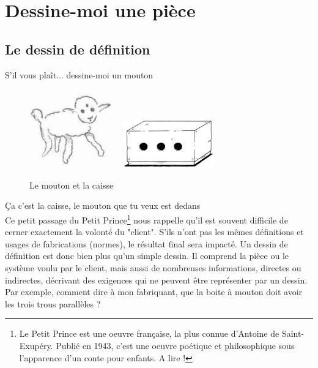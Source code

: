 \documentclass[
	11pt, %
	fleqn, %
	a4paper, %
]{LegrandOrangeBook}
\begin{document}

\chapter{Dessine-moi une pièce}
\section{Le dessin de définition}\label{dessin}


 \og S'il vous plaît... dessine-moi un mouton \fg


\begin{figure}[H] %
	\centering %
	\includegraphics[width=0.35\textwidth]{Images/Mou2.JPG} %
    \includegraphics[width=0.35\textwidth]{Images/Mou1.JPG} %
	\caption{Le mouton et la caisse}
	\label{Mou} %
\end{figure}



    \og Ça c'est la caisse, le mouton que tu veux est dedans\fg \\



Ce petit passage du Petit Prince\footnote{Le Petit Prince est une oeuvre française, la plus connue d'Antoine de Saint-Exupéry. Publié en 1943, c'est une oeuvre poétique et philosophique sous l'apparence d'un conte pour enfants. A lire !} nous rappelle qu'il est souvent difficile de cerner exactement la volonté du "client". S'ils n'ont pas les mêmes définitions et usages de fabrications (normes), le résultat final sera impacté. Un dessin de définition est donc bien plus qu'un simple dessin. Il comprend la pièce ou le système voulu par le client, mais aussi de nombreuses informations, directes ou indirectes, décrivant des exigences qui ne peuvent être représenter par un dessin. Par exemple, comment dire à mon fabriquant, que la boite à mouton doit avoir les trois trous parallèles ?\\
\end{document}
